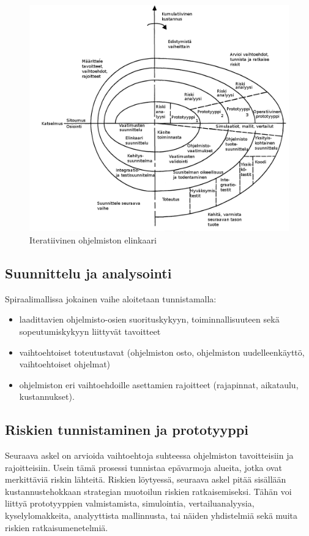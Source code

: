 \documentclass[finnish]{tktltiki2}
\theoremstyle{definition}
\theoremstyle{remark}
\begin{document}
\begin{figure}[h!]
  \caption{Iteratiivinen ohjelmiston elinkaari}
  \centering
    \includegraphics[width=\textwidth]{spiral}
\end{figure}

\subsection*{Suunnittelu ja analysointi}

Spiraalimallissa jokainen vaihe aloitetaan tunnistamalla:
\begin{itemize}
  \item laadittavien ohjelmisto-osien suorituskykyyn, toiminnallisuuteen sekä sopeutumiskykyyn liittyvät tavoitteet
  \item vaihtoehtoiset toteutustavat (ohjelmiston osto, ohjelmiston uudelleenkäyttö, vaihtoehtoiset ohjelmat)
  \item ohjelmiston eri vaihtoehdoille asettamien rajoitteet (rajapinnat, aikataulu, kustannukset)\cite{BOE88}.
\end{itemize}

\subsection*{Riskien tunnistaminen ja prototyyppi}

Seuraava askel on arvioida vaihtoehtoja suhteessa ohjelmiston tavoitteisiin ja rajoitteisiin. Usein tämä prosessi tunnistaa epävarmoja alueita, jotka ovat merkittäviä riskin lähteitä. Riskien löytyessä, seuraava askel pitää sisällään kustannustehokkaan strategian muotoilun riskien ratkaisemiseksi. Tähän voi liittyä prototyyppien valmistamista, simulointia, vertailuanalyysia, kyselylomakkeita, analyyttista mallinnusta, tai näiden yhdistelmiä sekä muita riskien ratkaisumenetelmiä\cite{BOE88}.
\end{document}
